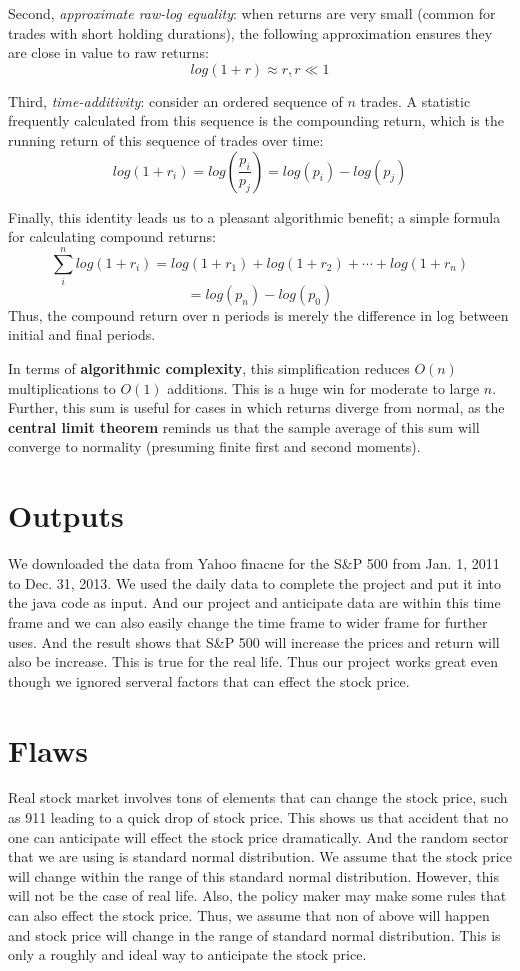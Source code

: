 \documentclass{article}
\begin{document}
Second, {\em approximate raw-log equality}: when returns are very small (common for trades with short holding durations), the following approximation ensures they are close in value to raw returns:
\[log(1 + r) \approx r , r \ll 1 \]

Third, {\em time-additivity}: consider an ordered sequence of $n$ trades. A statistic frequently calculated from this sequence is the compounding return, which is the running return of this sequence of trades over time:
\[log(1 + r_i) = log(\frac{p_i}{p_j}) = log(p_i) - log(p_j) \]

Finally, this identity leads us to a pleasant algorithmic benefit; a simple formula for calculating compound returns:
\[\sum_{i}^n log(1+r_i) = log(1 + r_1) + log(1 + r_2)  + \cdots + log(1 + r_n) \] \[= log(p_n) - log(p_0)\]
Thus, the compound return over n periods is merely the difference in log between initial and final periods.

In terms of {\bfseries algorithmic complexity}, this simplification reduces $O(n)$ multiplications to $O(1)$ additions. This is a huge win for moderate to large $n$. Further, this sum is useful for cases in which returns diverge from normal, as the {\bfseries central limit theorem} reminds us that the sample average of this sum will converge to normality (presuming finite first and second moments).

\newpage
\section{Outputs}
We downloaded the data from Yahoo finacne for the S\&P 500 from Jan. 1, 2011 to Dec. 31, 2013. We used the daily data to complete the project and put it into the java code as input. And our project and anticipate data are within this time frame and we can also easily change the time frame to wider frame for further uses. And the result shows that S\&P 500 will increase the prices and return will also be increase. This is true for the real life. Thus our project works great even though we ignored serveral factors that can effect the stock price. 

\section{Flaws}
Real stock market involves tons of elements that can change the stock price, such as 911 leading to a quick drop of stock price. This shows us that accident that no one can anticipate will effect the stock price dramatically. And the random sector that we are using is standard normal distribution. We assume that the stock price will change within the range of this standard normal distribution. However, this will not be the case of real life. Also, the policy maker may make some rules that can also effect the stock price. Thus, we assume that non of above will happen and stock price will change in the range of standard normal distribution. This is only a roughly and ideal way to anticipate the stock price. 
\end{document}
